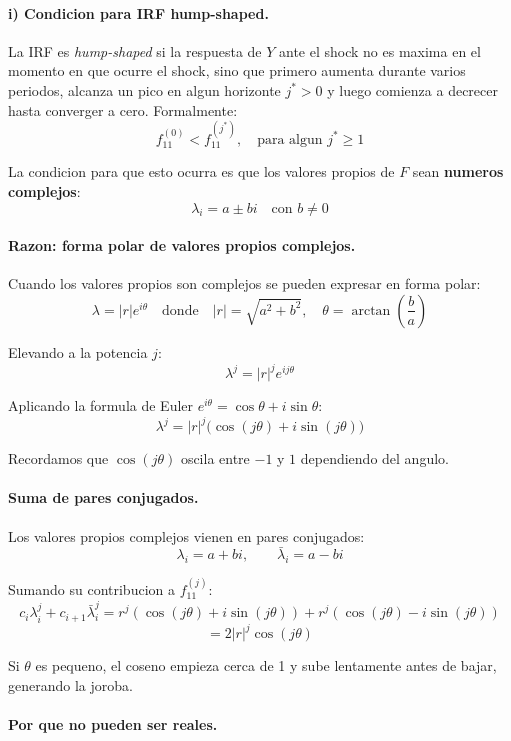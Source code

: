 \paragraph{i) Condicion para IRF hump-shaped.}

La IRF es \textit{hump-shaped} si la respuesta de $Y$ ante el shock no es maxima en el momento en que ocurre el shock, sino que primero aumenta durante varios periodos, alcanza un pico en algun horizonte $j^* > 0$ y luego comienza a decrecer hasta converger a cero. Formalmente:
\[
    f_{11}^{(0)} < f_{11}^{(j^*)}, \quad \text{para algun } j^* \geq 1
\]

La condicion para que esto ocurra es que los valores propios de $F$ sean \textbf{numeros complejos}:
\[
    \lambda_i = a \pm bi \quad \text{con } b \neq 0
\]

\paragraph{Razon: forma polar de valores propios complejos.}

Cuando los valores propios son complejos se pueden expresar en forma polar:
\[
    \lambda = |r| e^{i\theta}
    \quad \text{donde} \quad
    |r| = \sqrt{a^2 + b^2}, \quad
    \theta = \arctan\!\left(\frac{b}{a}\right)
\]

Elevando a la potencia $j$:
\[
    \lambda^j = |r|^j e^{ij\theta}
\]

Aplicando la formula de Euler $e^{i\theta} = \cos\theta + i\sin\theta$:
\[
    \lambda^j = |r|^j \bigl(\cos(j\theta) + i\sin(j\theta)\bigr)
\]

Recordamos que $\cos(j\theta)$ oscila entre $-1$ y $1$ dependiendo del angulo.

\paragraph{Suma de pares conjugados.}

Los valores propios complejos vienen en pares conjugados:
\[
    \lambda_i = a + bi, \qquad \bar{\lambda}_i = a - bi
\]

Sumando su contribucion a $f_{11}^{(j)}$:
\[
    c_i \lambda_i^j + c_{i+1} \bar{\lambda}_i^j
    = r^j(\cos(j\theta) + i\sin(j\theta)) + r^j(\cos(j\theta) - i\sin(j\theta))
\]
\[
    = 2|r|^j \cos(j\theta)
\]

Si $\theta$ es pequeno, el coseno empieza cerca de 1 y sube lentamente antes de bajar, generando la joroba.

\paragraph{Por que no pueden ser reales.}


